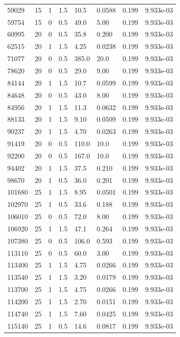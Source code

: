 \documentclass[preview]{standalone}
\begin{document}
{{\begin{tabular}{L{1.2cm}C{1.2cm} C{0.3cm}C{0.5cm} C{1.4cm}C{1.4cm} C{1.4cm}C{1.4cm}}
  59029  &    15  & 1     & 1.5 &  10.5  & 0.0588  & 0.199 &  9.933e-03   \\ 
  59754  &    15  & 0     & 0.5 &  49.0  & 5.00  & 0.199 &  9.933e-03   \\ 
  60995  &    20  & 0     & 0.5 &  35.8  & 0.200  & 0.199 &  9.933e-03   \\ 
  62515  &    20  & 1     & 1.5 &  4.25  & 0.0238  & 0.199 &  9.933e-03   \\ 
  71077  &    20  & 0     & 0.5 &  385.0  & 20.0  & 0.199 &  9.933e-03   \\ 
  78620  &    20  & 0     & 0.5 &  29.0  & 9.00  & 0.199 &  9.933e-03   \\ 
  84144  &    20  & 1     & 1.5 &  10.7  & 0.0599  & 0.199 &  9.933e-03   \\ 
  84648  &    20  & 0     & 0.5 &  43.0  & 8.00  & 0.199 &  9.933e-03   \\ 
  84956  &    20  & 1     & 1.5 &  11.3  & 0.0632  & 0.199 &  9.933e-03   \\ 
  88133  &    20  & 1     & 1.5 &  9.10  & 0.0509  & 0.199 &  9.933e-03   \\ 
  90237  &    20  & 1     & 1.5 &  4.70  & 0.0263  & 0.199 &  9.933e-03   \\ 
  91419  &    20  & 0     & 0.5 &  110.0  & 10.0  & 0.199 &  9.933e-03   \\ 
  92200  &    20  & 0     & 0.5 &  167.0  & 10.0  & 0.199 &  9.933e-03   \\ 
  94402  &    20  & 1     & 1.5 &  37.5  & 0.210  & 0.199 &  9.933e-03   \\ 
  98670  &    20  & 1     & 0.5 &  36.0  & 0.201  & 0.199 &  9.933e-03   \\ 
  101680  &    25  & 1     & 1.5 &  8.95  & 0.0501  & 0.199 &  9.933e-03   \\ 
  102970  &    25  & 1     & 0.5 &  33.6  & 0.188  & 0.199 &  9.933e-03   \\ 
  106010  &    25  & 0     & 0.5 &  72.0  & 8.00  & 0.199 &  9.933e-03   \\ 
  106920  &    25  & 1     & 1.5 &  47.1  & 0.264  & 0.199 &  9.933e-03   \\ 
  107380  &    25  & 0     & 0.5 &  106.0  & 0.593  & 0.199 &  9.933e-03   \\ 
  113110  &    25  & 0     & 0.5 &  60.0  & 3.00  & 0.199 &  9.933e-03   \\ 
  113400  &    25  & 1     & 1.5 &  4.75  & 0.0266  & 0.199 &  9.933e-03   \\ 
  113540  &    25  & 1     & 1.5 &  3.20  & 0.0179  & 0.199 &  9.933e-03   \\ 
  113700  &    25  & 1     & 1.5 &  4.75  & 0.0266  & 0.199 &  9.933e-03   \\ 
  114200  &    25  & 1     & 1.5 &  2.70  & 0.0151  & 0.199 &  9.933e-03   \\ 
  114740  &    25  & 1     & 1.5 &  7.60  & 0.0425  & 0.199 &  9.933e-03   \\ 
  115140  &    25  & 1     & 0.5 &  14.6  & 0.0817  & 0.199 &  9.933e-03   \\ 
\hline 
\end{tabular} 

}}
\end{document}
